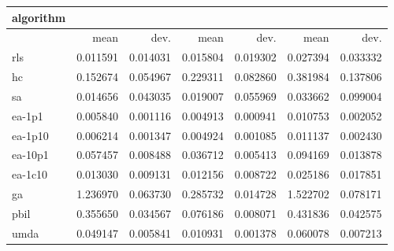 \begin{tabular}{@{}l*{6}{>{{}}N{1}{2}}@{}}
\toprule
{algorithm} &  &  &  \\
\midrule
& {mean} & {dev.} & {mean} & {dev.} & {mean} & {dev.} \\
\midrule
rls & 0.011591 & 0.014031 & 0.015804 & 0.019302 & 0.027394 & 0.033332 \\
 hc & 0.152674 & 0.054967 & 0.229311 & 0.082860 & 0.381984 & 0.137806 \\
 sa & 0.014656 & 0.043035 & 0.019007 & 0.055969 & 0.033662 & 0.099004 \\
 ea-1p1 & 0.005840 & 0.001116 & 0.004913 & 0.000941 & 0.010753 & 0.002052 \\
 ea-1p10 & 0.006214 & 0.001347 & 0.004924 & 0.001085 & 0.011137 & 0.002430 \\
 ea-10p1 & 0.057457 & 0.008488 & 0.036712 & 0.005413 & 0.094169 & 0.013878 \\
 ea-1c10 & 0.013030 & 0.009131 & 0.012156 & 0.008722 & 0.025186 & 0.017851 \\
 ga & 1.236970 & 0.063730 & 0.285732 & 0.014728 & 1.522702 & 0.078171 \\
 pbil & 0.355650 & 0.034567 & 0.076186 & 0.008071 & 0.431836 & 0.042575 \\
 umda & 0.049147 & 0.005841 & 0.010931 & 0.001378 & 0.060078 & 0.007213 \\
 \bottomrule
\end{tabular}
